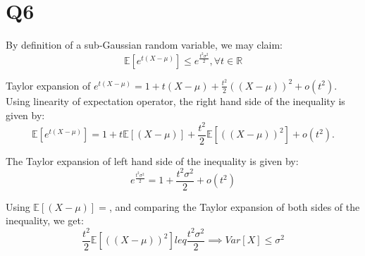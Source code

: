 \section{Q6}
\label{s:Q6}
By definition of a sub-Gaussian random variable, we may claim:
$$\mathbb{E}[e^{t(X-\mu)}] \leq e^{\frac{t^2\sigma^{2}}{2}}, \forall t \in \mathbb{R}$$

Taylor expansion of $e^{t(X-\mu)} = 1 + t(X-\mu) + \frac{t^2}{2}((X-\mu))^{2} + o(t^2)$. Using linearity of expectation operator, the right hand side of the inequality is given by:
$$\mathbb{E}[e^{t(X-\mu)}] = 1 + t\mathbb{E}[(X-\mu)] + \frac{t^2}{2}\mathbb{E}[((X-\mu))^2] + o(t^2).$$

The Taylor expansion of left hand side of the inequality is given by:
$$e^{\frac{t^2\sigma^{2}}{2}} = 1 + \frac{t^2\sigma^{2}}{2} + o(t^2)$$

Using $\mathbb{E}[(X-\mu)] = $, and comparing the Taylor expansion of both sides of the inequality, we get:
$$\frac{t^2}{2}\mathbb{E}[((X-\mu))^2] leq \frac{t^2\sigma^{2}}{2} \implies Var[X] \leq \sigma^2$$
 